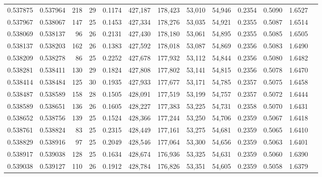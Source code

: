 \begin{tabular}{rrrrrrrrrrrrr}
0.537875 & 0.537964 & 218 &  29 &                                     0.1174 & 427,187 & 178,423 &  53,010 &  54,946 & 0.2354 & 0.5090 & 1.6527 \\
0.537967 & 0.538067 & 147 &  25 &                                     0.1453 & 427,334 & 178,276 &  53,035 &  54,921 & 0.2355 & 0.5087 & 1.6514 \\
0.538069 & 0.538137 &  96 &  26 &                                     0.2131 & 427,430 & 178,180 &  53,061 &  54,895 & 0.2355 & 0.5085 & 1.6505 \\
0.538137 & 0.538203 & 162 &  26 &                                     0.1383 & 427,592 & 178,018 &  53,087 &  54,869 & 0.2356 & 0.5083 & 1.6490 \\
0.538209 & 0.538278 &  86 &  25 &                                     0.2252 & 427,678 & 177,932 &  53,112 &  54,844 & 0.2356 & 0.5080 & 1.6482 \\
0.538281 & 0.538411 & 130 &  29 &                                     0.1824 & 427,808 & 177,802 &  53,141 &  54,815 & 0.2356 & 0.5078 & 1.6470 \\
0.538414 & 0.538484 & 125 &  30 &                                     0.1935 & 427,933 & 177,677 &  53,171 &  54,785 & 0.2357 & 0.5075 & 1.6458 \\
0.538487 & 0.538589 & 158 &  28 &                                     0.1505 & 428,091 & 177,519 &  53,199 &  54,757 & 0.2357 & 0.5072 & 1.6444 \\
0.538589 & 0.538651 & 136 &  26 &                                     0.1605 & 428,227 & 177,383 &  53,225 &  54,731 & 0.2358 & 0.5070 & 1.6431 \\
0.538652 & 0.538756 & 139 &  25 &                                     0.1524 & 428,366 & 177,244 &  53,250 &  54,706 & 0.2359 & 0.5067 & 1.6418 \\
0.538761 & 0.538824 &  83 &  25 &                                     0.2315 & 428,449 & 177,161 &  53,275 &  54,681 & 0.2359 & 0.5065 & 1.6410 \\
0.538829 & 0.538916 &  97 &  25 &                                     0.2049 & 428,546 & 177,064 &  53,300 &  54,656 & 0.2359 & 0.5063 & 1.6401 \\
0.538917 & 0.539038 & 128 &  25 &                                     0.1634 & 428,674 & 176,936 &  53,325 &  54,631 & 0.2359 & 0.5060 & 1.6390 \\
0.539038 & 0.539127 & 110 &  26 &                                     0.1912 & 428,784 & 176,826 &  53,351 &  54,605 & 0.2359 & 0.5058 & 1.6379 \\

\end{tabular}
